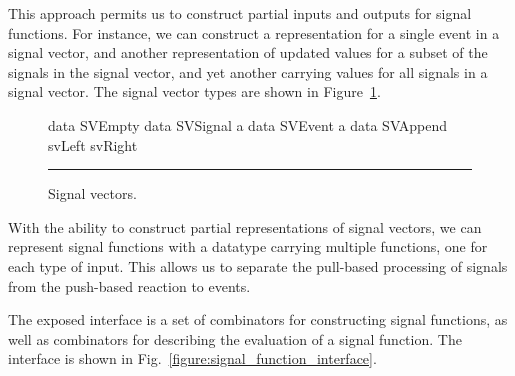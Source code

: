 \documentclass[draft]{llncs}
\begin{document}
This approach permits us to construct partial inputs and outputs for signal
functions. For instance, we can construct a representation for a single event
in a signal vector, and another representation of updated values for a subset of
the signals in the signal vector, and yet another carrying values for all
signals in a signal vector. The signal vector types are shown in
Figure~\ref{figure:signal_vectors}.

\begin{figure}[t]
\begin{code}
data SVEmpty
data SVSignal a
data SVEvent a
data SVAppend svLeft svRight
\end{code}
\hrule
\caption{Signal vectors.}
\label{figure:signal_vectors}
\end{figure}

With the ability to construct partial representations of signal vectors, we can
represent signal functions with a datatype carrying multiple functions, one for
each type of input. This allows us to separate the pull-based processing of
signals from the push-based reaction to events.

The exposed interface is a set of combinators for constructing signal functions,
as well as combinators for describing the evaluation of a signal function. The
interface is shown in Fig.~\ref{figure:signal_function_interface}.
\end{document}
